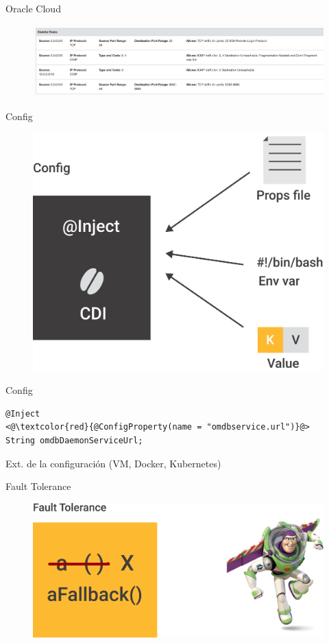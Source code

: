 \documentclass{beamer}
\begin{document}
\begin{frame}{Oracle Cloud}

\begin{figure}
\centering
\includegraphics[width=\linewidth]{Images/oc5}
\end{figure}
\end{frame}

\begin{frame}{Config}
\begin{figure}
	\centering
	\includegraphics[width=0.75\linewidth]{Images/config}
\end{figure}
\end{frame}




\begin{frame}[fragile]{Config}
\begin{lstlisting}
@Inject
<@\textcolor{red}{@ConfigProperty(name = "omdbservice.url")}@>
String omdbDaemonServiceUrl;
\end{lstlisting}

Ext. de la configuración (VM, Docker, Kubernetes)
\end{frame}


\begin{frame}{Fault Tolerance}
\begin{figure}
	\centering
	\includegraphics[width=0.75\linewidth]{Images/faulttolerance}
\end{figure}
\end{frame}
\end{document}
